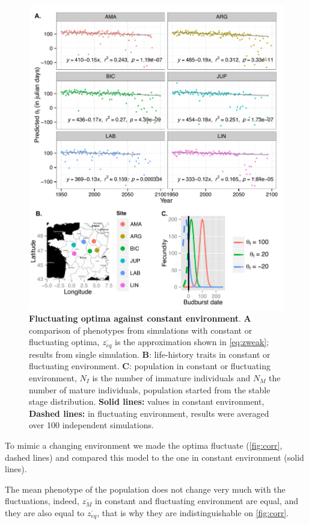 \begin{figure}[ht!]
	\centering
	\includegraphics[scale=1]{Figures/PhenoLHTwithCorr.pdf}
	\caption{\textbf{Fluctuating optima against constant environment}. \textbf{A} comparison of phenotypes from simulations with constant or fluctuating optima, $\overline{z_{eq}}$ is the approximation shown in \autoref{eq:zweak}; results from single simulation. \textbf{B}: life-history traits in constant or fluctuating environment. \textbf{C}: population in constant or fluctuating environment, $N_I$ is the number of immature individuals and $N_M$ the number of mature individuals, population started from the stable stage distribution. \textbf{Solid lines:} values in constant environment, \textbf{Dashed lines:} in fluctuating environment, results were averaged over 100 independent simulations.}
	\label{fig:corr}
\end{figure}

To mimic a changing environment we made the optima fluctuate (\autoref{fig:corr}, dashed lines) and compared this model to the one in constant environment (solid lines).

The mean phenotype of the population does not change very much with the fluctuations, indeed, $\overline{z_M}$ in constant and fluctuating environment are equal, and they are also equal to $\overline{z_{eq}}$, that is why they are indistinguishable on \autoref{fig:corr}.

